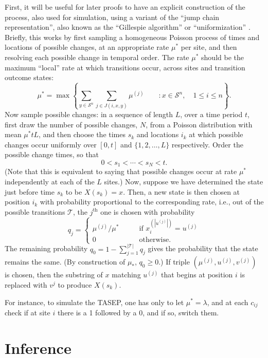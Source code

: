 \documentclass{article}
\newcommand{\calS}{\mathcal{S}}  %
\newcommand{\calT}{\mathcal{T}}  %
\newcommand{\st}{\colon}  %
\theoremstyle{plain}
\theoremstyle{definition}
\begin{document}
First, it will be useful for later proofs to have an explicit construction of the process,
also used for simulation,
using a variant of the ``jump chain representation'', also known as the ``Gillespie algorithm''
or ``uniformization'' \citep{hobolth2009simulation}.
Briefly, this  works by first sampling a homogeneous Poisson process of times and locations of possible changes,
at an appropriate rate $\mu^*$ per site,
and then resolving each possible change in temporal order.
The rate $\mu^*$ should be the maximum ``local'' rate at which transitions occur, across sites and transition outcome states:
\[
    \mu^* = \max \left\{ \sum_{y \in \calS^n} \sum_{j\in J(i,x,y)} \mu^{(j)} \qquad \st x \in \calS^n, \quad 1 \le i \le n \right\} .
\]
Now sample possible changes:
in a sequence of length $L$, over a time period $t$,
first draw the number of possible changes, $N$,
from a Poisson distribution with mean $\mu^* t L$,
and then choose the times $s_k$ and locations $i_k$
at which possible changes occur uniformly
over $[0, t]$ and $\{1, 2, \ldots, L\}$ respectively.
Order the possible change times, so that
\[
    0 < s_1 < \cdots < s_N < t .
\]
(Note that this is equivalent to saying that possible
changes occur at rate $\mu^*$ independently at each of the $L$ sites.)
Now, suppose we have determined the state just before time $s_k$ to be $X(s_k) = x$.
Then, a new state is then chosen at position $i_k$
with probability proportional to the corresponding rate, i.e.,
out of the possible transitions $\calT$, the $j^\text{th}$ one is chosen
with probability
\[
q_j = \begin{cases}
    \mu^{(j)}/\mu^* \qquad & \text{if } x_i^{(|u^{(j)}|)} = u^{(j)}  \\
    0 \qquad & \text{otherwise.}
\end{cases}
\]
The remaining probability $q_0 = 1-\sum_{j=1}^{|\calT|} q_j$
gives the probability that the state remains the same.
(By construction of $\mu_*$, $q_0\ge 0$.)
If triple $(\mu^{(j)}, u^{(j)}, v^{(j)})$ is chosen, then
the substring of $x$ matching $u^{(j)}$ that begins at position $i$
is replaced with $v^j$ to produce $X(s_k)$.

For instance, to simulate the TASEP, one has only to let $\mu^*=\lambda$, and at each $c_{ij}$
check if at site $i$ there is a 1 followed by a 0,
and if so, switch them.


\section{Inference}
\end{document}
